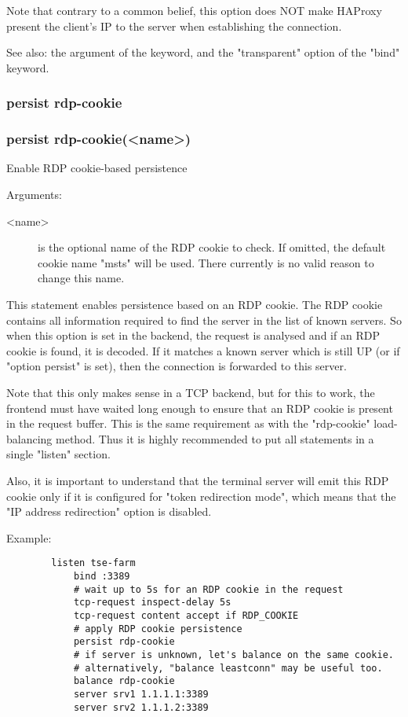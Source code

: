   Note that contrary to a common belief, this option does NOT make HAProxy
  present the client's IP to the server when establishing the connection.

  See also: the  argument of the  keyword, and the
            "transparent" option of the "bind" keyword.

\subsubsection{persist rdp-cookie}
\subsubsection*{persist rdp-cookie(<name>)}


  Enable RDP cookie-based persistence


  Arguments:
  \begin{description}
  \item[<name>] is the optional name of the RDP cookie to check. If omitted, the
              default cookie name "msts" will be used. There currently is no
              valid reason to change this name.
  \end{description}

  This statement enables persistence based on an RDP cookie. The RDP cookie
  contains all information required to find the server in the list of known
  servers. So when this option is set in the backend, the request is analysed
  and if an RDP cookie is found, it is decoded. If it matches a known server
  which is still UP (or if "option persist" is set), then the connection is
  forwarded to this server.

  Note that this only makes sense in a TCP backend, but for this to work, the
  frontend must have waited long enough to ensure that an RDP cookie is present
  in the request buffer. This is the same requirement as with the "rdp-cookie"
  load-balancing method. Thus it is highly recommended to put all statements in
  a single "listen" section.

  Also, it is important to understand that the terminal server will emit this
  RDP cookie only if it is configured for "token redirection mode", which means
  that the "IP address redirection" option is disabled.

  Example:
  \begin{verbatim}
        listen tse-farm
            bind :3389
            # wait up to 5s for an RDP cookie in the request
            tcp-request inspect-delay 5s
            tcp-request content accept if RDP_COOKIE
            # apply RDP cookie persistence
            persist rdp-cookie
            # if server is unknown, let's balance on the same cookie.
            # alternatively, "balance leastconn" may be useful too.
            balance rdp-cookie
            server srv1 1.1.1.1:3389
            server srv2 1.1.1.2:3389
  \end{verbatim}

